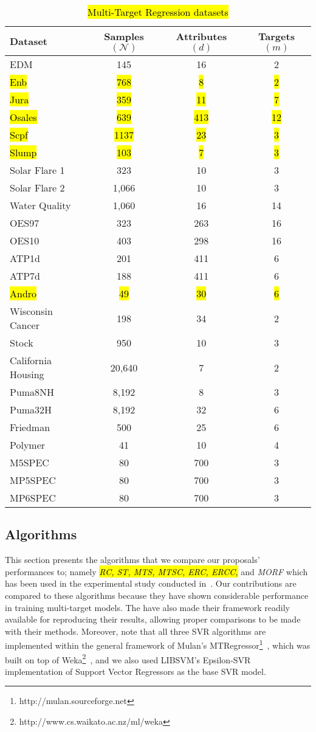 \documentclass[preprint,12pt]{elsarticle}
\begin{document}
\begin{table*}[!b]
\centering
\scriptsize
\caption{\hl{Multi-Target Regression datasets}}
\begin{tabular}{lccc}
\hline
Dataset & Samples $(\mathcal N)$ & Attributes $(d)$ & Targets $(m)$\\
\hline
EDM & 145 & 16 & 2\\
\hl{Enb} & \hl{768} & \hl{8} & \hl{2} \\
\hl{Jura} & \hl{359} & \hl{11} & \hl{7} \\
\hl{Osales} & \hl{639} & \hl{413} & \hl{12} \\
\hl{Scpf} & \hl{1137} & \hl{23} & \hl{3} \\
\hl{Slump} & \hl{103} & \hl{7} & \hl{3} \\
Solar Flare 1 & 323 & 10 & 3\\
Solar Flare 2 & 1,066 & 10 & 3\\
Water Quality & 1,060 & 16 & 14\\
OES97 & 323 & 263 & 16\\
OES10 & 403 & 298 & 16\\
ATP1d & 201 & 411 & 6\\
ATP7d & 188 & 411 & 6\\
\hl{Andro} & \hl{49} & \hl{30} & \hl{6} \\
Wisconsin Cancer & 198 & 34 & 2\\
Stock & 950 & 10 & 3\\
California Housing & 20,640 & 7 & 2\\
Puma8NH & 8,192 & 8 & 3\\
Puma32H & 8,192 & 32 & 6\\
Friedman & 500 & 25 & 6\\
Polymer & 41 & 10 & 4\\
M5SPEC & 80 & 700 & 3\\
MP5SPEC & 80 & 700 & 3\\
MP6SPEC & 80 & 700 & 3\\
\hline
\end{tabular}
\label{tab:datasets}
\end{table*}

\subsection{Algorithms}\label{subsec:algorithmsres}
This section presents the algorithms that we compare our proposals' performances to; namely \hl{\textit{RC, ST, MTS, MTSC, ERC, ERCC,}} and \textit{MORF} which has been used in the experimental study conducted in~\cite{Spyromitros2014}. Our contributions are compared to these algorithms because they have shown considerable performance in training multi-target models. The have also made their framework readily available for reproducing their results, allowing proper comparisons to be made with their methods. Moreover, note that all three SVR algorithms are implemented within the general framework of Mulan's MTRegressor\footnote{http://mulan.sourceforge.net}~\cite{mulan}, which was built on top of Weka\footnote{http://www.cs.waikato.ac.nz/ml/weka}~\cite{weka}, and we also used LIBSVM's Epsilon-SVR~\cite{CC01a} implementation of Support Vector Regressors as the base SVR model.
\end{document}
